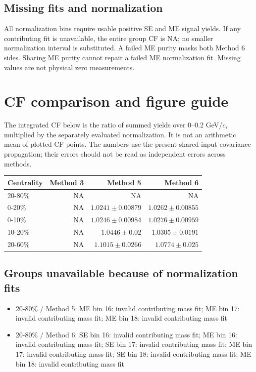 \documentclass[10pt,a4paper]{article}
\begin{document}
\subsection*{Missing fits and normalization}
All normalization bins require usable positive SE and ME signal yields. If any contributing fit is unavailable, the entire group CF is NA; no smaller normalization interval is substituted. A failed ME purity masks both Method 6 sides. Sharing ME purity cannot repair a failed ME normalization fit. Missing values are not physical zero measurements.
\clearpage\section{CF comparison and figure guide}
The integrated CF below is the ratio of summed yields over 0--0.2 GeV/$c$, multiplied by the separately evaluated normalization. It is not an arithmetic mean of plotted CF points. The numbers use the present shared-input covariance propagation; their errors should not be read as independent errors across methods.
\begin{center}\begin{tabular}{lrrr}\toprule Centrality & Method 3 & Method 5 & Method 6\\\midrule
20-80\% & NA & NA & NA\\
0-20\% & NA & $1.0241\pm0.00879$ & $1.0262\pm0.00855$\\
0-10\% & NA & $1.0246\pm0.00984$ & $1.0276\pm0.00959$\\
10-20\% & NA & $1.0446\pm0.02$ & $1.0305\pm0.0191$\\
20-60\% & NA & $1.1015\pm0.0266$ & $1.0774\pm0.025$\\
\bottomrule\end{tabular}\end{center}
\subsection*{Groups unavailable because of normalization fits}
{\small\begin{itemize}
\item 20-80\% / Method 5: ME bin 16: invalid contributing mass fit; ME bin 17: invalid contributing mass fit; ME bin 18: invalid contributing mass fit
\item 20-80\% / Method 6: SE bin 16: invalid contributing mass fit; ME bin 16: invalid contributing mass fit; SE bin 17: invalid contributing mass fit; ME bin 17: invalid contributing mass fit; SE bin 18: invalid contributing mass fit; ME bin 18: invalid contributing mass fit
\end{itemize}}
\end{document}
